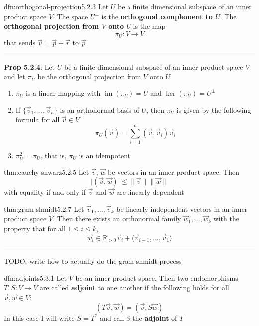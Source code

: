 \documentclass[landscape, 8pt]{extarticle}
\DeclareMathOperator{\im}{im}
\begin{document}
\begin{multicols}{3}
\begin{dfn}{dfn:orthogonal-projection}{5.2.3}
    Let $U$ be a finite dimensional subspace of an inner product space $V$. The space $U^{\bot}$ is the \textbf{orthogonal complement to $U$}. The \textbf{orthogonal projection from $V$ onto $U$} is the map
    \[\pi_{U} : V \to V\]
    that sends $\vec{v} = \vec{p} + \vec{r}$ to $\vec{p}$

    \noindent\rule{\textwidth}{0.2pt}
    \textbf{Prop 5.2.4}: Let $U$ be a finite dimensional subspace of an inner product space $V$ and let $\pi_{U}$ be the orthogonal projection from $V$ onto $U$
    \begin{enumerate}
        \setlength\itemsep{0em}
        \item $\pi_{U}$ is a linear mapping with $\im(\pi_{U}) = U$ and $\ker (\pi_{U}) = U^{\bot}$
        \item If $\{\vec{v}_{1},\dots,\vec{v}_{n}\}$ is an orthonormal basis of $U$, then $\pi_{U}$ is given by the following formula for all $\vec{v}\in V$
            \[\pi_{U}(\vec{v}) = \sum_{i = 1}^{n} (\vec{v}, \vec{v}_{i}) \vec{v}_{i}\]
        \item $\pi_{U}^{2} = \pi_{U}$, that is, $\pi_{U}$ is an idempotent
    \end{enumerate}
\end{dfn}

\begin{thm}{thm:cauchy-shwarz}{5.2.5}
    Let $\vec{v}$, $\vec{w}$ be vectors in an inner product space. Then
    \[\lvert (\vec{v}, \vec{w}) \rvert \le \lVert \vec{v} \rVert \lVert \vec{w} \rVert\]
    with equality if and only if $\vec{v}$ and $\vec{w}$ are linearly dependent
\end{thm}

\begin{thm}{thm:gram-shmidt}{5.2.7}
    Let $\vec{v}_{1},\dots,\vec{v}_{k}$ be linearly independent vectors in an inner product space $V$. Then there exists an orthonormal family $\vec{w}_{1},\dots,\vec{w}_{k}$ with the property that for all $1 \le i \le k$,
    \[\vec{w}_{i} \in \mathbb{R}_{>0} \vec{v}_{i} + \langle \vec{v}_{i - 1},\dots,\vec{v}_{1} \rangle\]

    \noindent\rule{\textwidth}{0.2pt}
    TODO: write how to actually do the gram-shmidt process
\end{thm}

\begin{dfn}[Adjoints]{dfn:adjoints}{5.3.1}
    Let $V$ be an inner product space. Then two endomorphisms $T, S : V\to V$ are called \textbf{adjoint} to one another if the following holds for all $\vec{v}, \vec{w}\in V$:
    \[(T \vec{v}, \vec{w}) = (\vec{v}, S\vec{w})\]
    In this case I will write $S = T^{*}$ and call $S$ the \textbf{adjoint} of $T$


\end{dfn}
\end{multicols}
\end{document}
